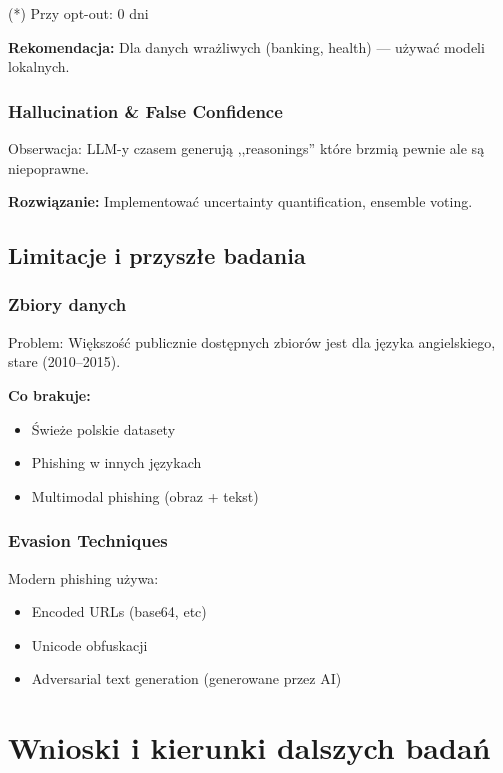 \documentclass[11pt]{extreport}
\begin{document}
(*) Przy opt-out: 0 dni

\textbf{Rekomendacja:} Dla danych wrażliwych (banking, health) --- używać modeli lokalnych.

\subsection{Hallucination \& False Confidence}

Obserwacja: LLM-y czasem generują ,,reasonings'' które brzmią pewnie ale są niepoprawne.

\textbf{Rozwiązanie:} Implementować uncertainty quantification, ensemble voting.

\section{Limitacje i przyszłe badania}
\label{sec:limitacje}

\subsection{Zbiory danych}

Problem: Większość publicznie dostępnych zbiorów jest dla języka angielskiego, stare (2010--2015).

\textbf{Co brakuje:}
\begin{itemize}
    \item Świeże polskie datasety
    \item Phishing w innych językach
    \item Multimodal phishing (obraz + tekst)
\end{itemize}

\subsection{Evasion Techniques}

Modern phishing używa:
\begin{itemize}
    \item Encoded URLs (base64, etc)
    \item Unicode obfuskacji
    \item Adversarial text generation (generowane przez AI)
\end{itemize}

\chapter{Wnioski i kierunki dalszych badań}
\label{ch:wnioski}
\end{document}

